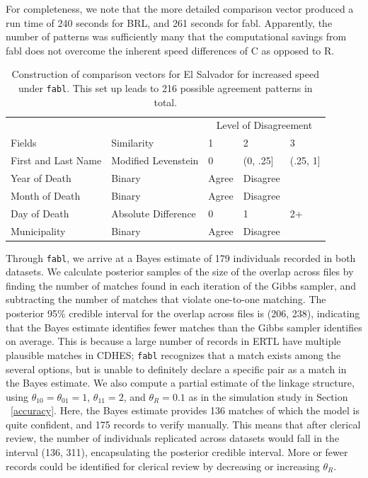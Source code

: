 \documentclass[ba]{imsart}
\begin{document}
	For completeness, we note that the more detailed comparison vector produced a run time of 240 seconds for BRL, and 261 seconds for fabl.  Apparently, the number of patterns was sufficiently many that the computational savings from fabl does not overcome the inherent speed differences of C as opposed to R.
	
	\begin{table}
		\centering
		\begin{tabular}[t]{lllll}
			\hline
			\multicolumn{2}{c}{ } & \multicolumn{3}{c}{Level of Disagreement} \\
			\cline{3-5}
			Fields & Similarity & 1 & 2 & 3\\
			\hline
			First and Last Name & Modified Levenstein & 0 & (0, .25] & (.25, 1]\\
			Year of Death & Binary & Agree & Disagree & \\
			Month of Death & Binary & Agree & Disagree & \\
			Day of Death & Absolute Difference & 0 & 1 & 2+\\
			Municipality & Binary & Agree & Disagree & \\
			\hline
		\end{tabular}
		\caption{Construction of comparison vectors for El Salvador for increased speed under \texttt{fabl}. This set up leads to 216 possible agreement patterns in total.}\label{Tab:el_salvador_cutoffs_2}
	\end{table}
	
	Through \texttt{fabl}, we arrive at a Bayes estimate of 179 individuals recorded in both datasets. We calculate posterior samples of the size of the overlap across files by finding the number of matches found in each iteration of the Gibbs sampler, and subtracting the number of matches that violate one-to-one matching. The posterior 95\% credible interval for the overlap across files is (206, 238), indicating that the Bayes estimate identifies fewer matches than the Gibbs sampler identifies on average. This is because a large number of records in ERTL have multiple plausible matches in CDHES; \texttt{fabl} recognizes that a match exists among the several options, but is unable to definitely declare a specific pair as a match in the Bayes estimate. We also compute a partial estimate of the linkage structure, using $\theta_{10} = \theta_{01} = 1$, $\theta_{11} = 2$, and $\theta_R = 0.1$ as in the simulation study in Section ~\ref{accuracy}. Here, the Bayes estimate provides 136 matches of which the model is quite confident, and 175 records to verify manually. This means that after clerical review, the number of individuals replicated across datasets would fall in the interval (136, 311), encapsulating the posterior credible interval. More or fewer records could be identified for clerical review by decreasing or increasing $\theta_R$. 
	
\end{document}
